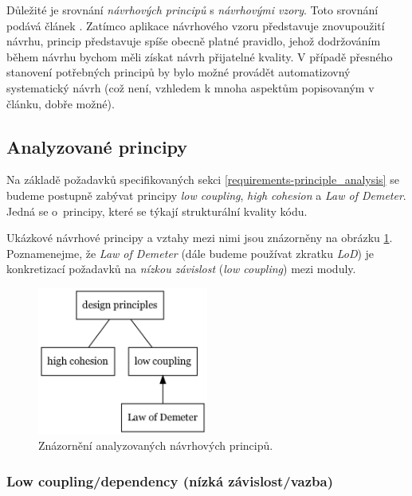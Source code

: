 Důležité je srovnání \emph{návrhových principů} s \emph{návrhovými vzory}. Toto srovnání podává článek \cite{612257}. Zatímco aplikace návrhového vzoru představuje znovupoužití  návrhu, princip představuje spíše obecně platné pravidlo, jehož dodržováním během návrhu bychom měli získat návrh přijatelné kvality. V případě přesného stanovení potřebných principů by bylo možné provádět automatizovný systematický návrh (což není, vzhledem k mnoha aspektům popisovaným v článku, dobře možné).

\subsection{Analyzované principy}
Na základě požadavků specifikovaných sekci \ref{requirements-principle_analysis} se budeme postupně zabývat principy \emph{low coupling}, \emph{high cohesion} a \emph{Law of Demeter}. Jedná se o~principy, které se týkají strukturální kvality kódu.

Ukázkové návrhové principy a vztahy mezi nimi jsou znázorněny na obrázku \ref{analyzed_principles}. Poznamenejme, že \emph{Law of Demeter} (dále budeme používat zkratku \emph{LoD}) je konkretizací požadavků na \emph{nízkou závislost} (\emph{low coupling}) mezi moduly.

\begin{figure}[h!]
  \centering
  \includegraphics[width=0.5\textwidth]{./graphs/oop_design_principles.png}
  \caption{Znázornění analyzovaných návrhových principů.\label{analyzed_principles}}
\end{figure}

\subsubsection{Low coupling/dependency (nízká závislost/vazba)}



